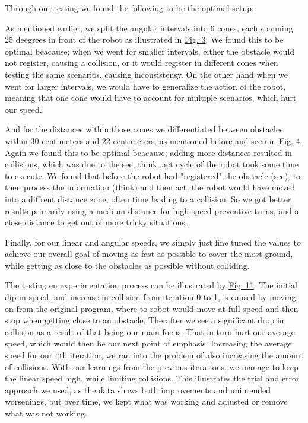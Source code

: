 \documentclass[conference]{IEEEtran}
\begin{document}
Through our testing we found the following to be the optimal setup:

As mentioned earlier, we split the angular intervals into 6 cones, each spanning 25 deegrees in front of the robot as illustrated in \href{sec:angles}{Fig. 3}.
We found this to be optimal beacause; when we went for smaller intervals, either the obstacle would not register, causing a collision, or it would register in different cones when testing the same scenarios, causing inconsistensy.
On the other hand when we went for larger intervals, we would have to generalize the action of the robot, meaning that one cone would have to account for multiple scenarios, which hurt our speed.

And for the distances within those cones we differentiated between obstacles within 30 centimeters and 22 centimeters, as mentioned before and seen in \href{sec:distances}{Fig. 4}.
Again we found this to be optimal beacause; adding more distances resulted in collisions, which was due to the see, think, act cycle of the robot took some time to execute.
We found that before the robot had "registered" the obstacle (see), to then process the information (think) and then act, the robot would have moved into a diffrent distance zone, often time leading to a collision.
So we got better results primarily using a medium distance for high speed preventive turns, and a close distance to get out of more tricky situations.

Finally, for our linear and angular speeds, we simply just fine tuned the values to achieve our overall goal of moving as fast as possible to cover the most ground, while getting as close to the obstacles as possible without colliding.

The testing en experimentation process can be illustrated by \href{sec:graph}{Fig. 11}.
The initial dip in speed, and increase in collision from iteration 0 to 1, is caused by moving on from the original program, where to robot would move at full speed and then stop when getting close to an obstacle.
Therafter we see a significant drop in collision as a result of that being our main focus.
That in turn hurt our average speed, which would then be our next point of emphasis.
Increasing the average speed for our 4th iteration, we ran into the problem of also increasing the amount of collisions.
With our learnings from the previous iterations, we manage to keep the linear speed high, while limiting collisions.
This illustrates the trial and error approach we used, as the data shows both improvements and unintended worsenings, but over time, we kept what was working and adjusted or remove what was not working. 
\end{document}
